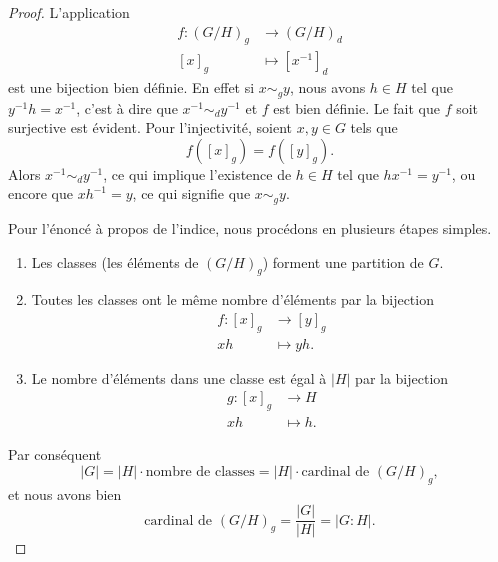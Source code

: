 \begin{proof}
    L'application
    \begin{equation}
        \begin{aligned}
            f\colon (G/H)_g&\to (G/H)_d \\
            [x]_g&\mapsto [x^{-1}]_d
        \end{aligned}
    \end{equation}
    est une bijection bien définie. En effet si \( x\sim_g y\), nous avons \( h\in H\) tel que \( y^{-1}h=x^{-1}\), c'est à dire que \( x^{-1}\sim_d y^{-1}\) et \( f\) est bien définie. Le fait que \( f\) soit surjective est évident. Pour l'injectivité, soient \( x, y \in G \) tels que
    \begin{equation}
        f([x]_g)=f([y]_g).
    \end{equation}
    Alors \( x^{-1}\sim_d y^{-1}\), ce qui implique l'existence de \( h\in H\) tel que \( hx^{-1}=y^{-1}\), ou encore que \( xh^{-1}=y\), ce qui signifie que \( x\sim_gy\).

    Pour l'énoncé à propos de l'indice, nous procédons en plusieurs étapes simples.
    \begin{enumerate}
        \item
            Les classes (les éléments de \( (G/H)_g\)) forment une partition de $G$.
        \item
            Toutes les classes ont le même nombre d'éléments par la bijection
            \begin{equation}
                \begin{aligned}
                    f\colon [x]_g&\to [y]_g \\
                    xh&\mapsto yh.
                \end{aligned}
            \end{equation}
        \item
            Le nombre d'éléments dans une classe est égal à \( | H |\) par la bijection
            \begin{equation}
                \begin{aligned}
                    g\colon [x]_g&\to H \\
                    xh&\mapsto h.
                \end{aligned}
            \end{equation}
    \end{enumerate}
    Par conséquent
    \begin{equation}
        | G |=| H |\cdot \text{nombre de classes}=| H |\cdot\text{cardinal de $(G/H)_g$},
    \end{equation}
    et nous avons bien
    \begin{equation}
        \text{cardinal de }(G/H)_g=\frac{ | G | }{ | H | }=| G:H |.
    \end{equation}
\end{proof}

